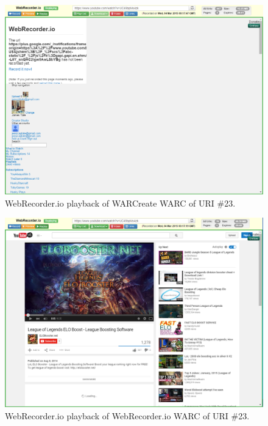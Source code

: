 \documentclass[a4paper,12pt]{article}
\begin{document}
\begin{appendices}
\begin{figure}[H]
    \includegraphics[scale=0.5]{images/23_warcreate_in_webrecorder.png}
    \caption{WebRecorder.io playback of WARCreate WARC of URI \#23.}
\end{figure}
\begin{figure}[H]
    \centering
    \includegraphics[scale=0.5]{images/23_webrecorder_in_webrecorder.png}
    \caption{WebRecorder.io playback of WebRecorder.io WARC of URI \#23.}
\end{figure}


\end{appendices}
\end{document}
